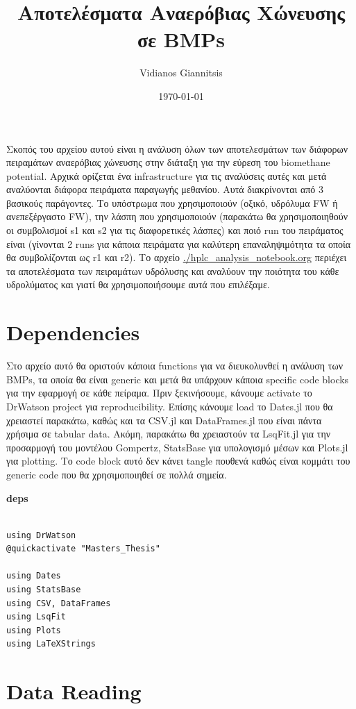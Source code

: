 \documentclass[11pt]{article}
\author{Vidianos Giannitsis}
\date{\today}
\title{Αποτελέσματα Αναερόβιας Χώνευσης σε BMPs}
\begin{document}
\maketitle
\tableofcontents

Σκοπός του αρχείου αυτού είναι η ανάλυση όλων των αποτελεσμάτων των διάφορων πειραμάτων αναερόβιας χώνευσης στην διάταξη για την εύρεση του biomethane potential. Αρχικά ορίζεται ένα infrastructure για τις αναλύσεις αυτές και μετά αναλύονται διάφορα πειράματα παραγωγής μεθανίου. Αυτά διακρίνονται από 3 βασικούς παράγοντες. Το υπόστρωμα που χρησιμοποιούν (οξικό, υδρόλυμα FW ή ανεπεξέργαστο FW), την λάσπη που χρησιμοποιούν (παρακάτω θα χρησιμοποιηθούν οι συμβολισμοί s1 και s2 για τις διαφορετικές λάσπες) και ποιό run του πειράματος είναι (γίνονται 2 runs για κάποια πειράματα για καλύτερη επαναληψιμότητα τα οποία θα συμβολίζονται ως r1 και r2). Το αρχείο \url{./hplc\_analysis\_notebook.org} περιέχει τα αποτελέσματα των πειραμάτων υδρόλυσης και αναλύουν την ποιότητα του κάθε υδρολύματος και γιατί θα χρησιμοποιήσουμε αυτά που επιλέξαμε.

\section{Dependencies}
\label{sec:orga2a3062}
Στο αρχείο αυτό θα οριστούν κάποια functions για να διευκολυνθεί η ανάλυση των BMPs, τα οποία θα είναι generic και μετά θα υπάρχουν κάποια specific code blocks για την εφαρμογή σε κάθε πείραμα. Πριν ξεκινήσουμε, κάνουμε activate το DrWatson project για reproducibility. Επίσης κάνουμε load το Dates.jl που θα χρειαστεί παρακάτω, καθώς και τα CSV.jl και DataFrames.jl που είναι πάντα χρήσιμα σε tabular data. Ακόμη, παρακάτω θα χρειαστούν τα LsqFit.jl για την προσαρμογή του μοντέλου Gompertz, StatsBase για υπολογισμό μέσων και Plots.jl για plotting. Το code block αυτό δεν κάνει tangle πουθενά καθώς είναι κομμάτι του generic code που θα χρησιμοποιηθεί σε πολλά σημεία.

\textbf{deps}
\begin{verbatim}

using DrWatson
@quickactivate "Masters_Thesis"

using Dates
using StatsBase
using CSV, DataFrames
using LsqFit
using Plots
using LaTeXStrings

\end{verbatim}

\section{Data Reading}
\label{sec:orgf6093b3}
\end{document}

